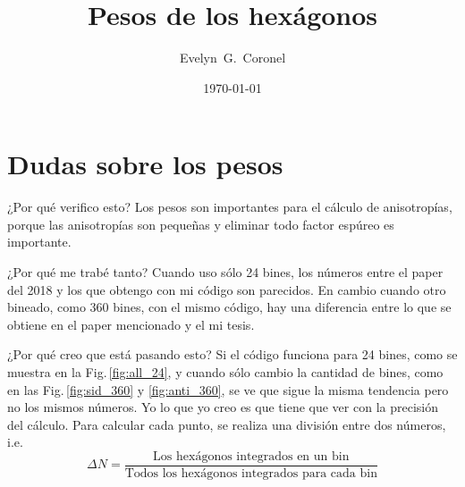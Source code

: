 



\title{Pesos de los hexágonos}
\author{Evelyn~G.~Coronel}


\date[]{\lowercase{\today}} %


\maketitle


\section{Dudas sobre los pesos}

¿Por qué verifico esto? Los pesos son importantes para el cálculo de anisotropías, porque las anisotropías son pequeñas y eliminar todo factor espúreo es importante.

¿Por qué me trabé tanto? Cuando uso sólo 24 bines, los números entre el paper del 2018 y los que obtengo con mi código son parecidos. En cambio cuando otro bineado, como 360 bines, con el mismo código, hay una diferencia entre lo que se obtiene en el paper mencionado y el mi tesis.

¿Por qué creo que está pasando esto? Si el código funciona para 24 bines, como se muestra en la Fig.\,\ref{fig:all_24}, y cuando sólo cambio la cantidad de bines, como en las Fig.\,\ref{fig:sid_360} y \ref{fig:anti_360}, se ve que sigue la misma tendencia pero no los mismos números. Yo lo que yo creo es que tiene que ver con la precisión del cálculo. Para calcular cada punto, se realiza una división entre dos números, i.e. 
\begin{equation}
	\Delta N = \frac{\text{Los hexágonos integrados en un bin}}{\text{Todos los hexágonos integrados para cada bin}}
\end{equation}


